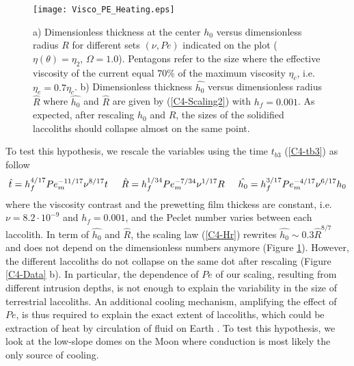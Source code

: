 \begin{figure}[h!]
  \begin{center}
    \graphicspath{ {/Users/thorey/Documents/These/Projet/Refroidissement/Skin_Model/Figure/Figure_Heating/} }
    \texttt{[image: Visco\_PE\_Heating.eps]}
    \caption{a)  Dimensionless thickness  at the  center $h_0$  versus
      dimensionless radius $R$ for different sets $(\nu,Pe)$ indicated
      on  the plot  ($\eta(\theta)=\eta_2$, $\Omega=1.0$).   Pentagons
      refer to the  size where the effective viscosity  of the current
      equal   $70\%$  of   the   maximum   viscosity  $\eta_c$,   i.e.
      $\eta_e=0.7\eta_c$.   b)   Dimensionless  thickness  $\hat{h_0}$
      versus  dimensionless  radius  $\hat{R}$ where  $\hat{h_0}$  and
      $\hat{R}$ are given by (\ref{C4-Scaling2}) with $h_f=0.001$.  As
      expected,  after  rescaling $h_0$  and  $R$,  the sizes  of  the
      solidified  laccoliths  should  collapse   almost  on  the  same
      point. }
    \label{C4-Visco_PE_Heating}
  \end{center}
\end{figure}


To  test this  hypothesis, we  rescale  the variables  using the  time
$t_{b3}$ (\ref{C4-tb3}) as follow
\begin{equation}
  \hat{t}=   h_f^{4/17}  Pe_m^{-11/17}\nu^{8/17}t      \hspace{.5cm}     \hat{R}=
  h_f^{1/34}Pe_m^{-7/34}\nu^{1/17}R\hspace{.5cm}                        \hat{h_0}=
  h_f^{3/17}Pe_m^{-4/17}\nu^{6/17}h_0
  \label{C4-Scaling2}
\end{equation}
where  the viscosity  contrast and  the prewetting  film thickess  are
constant,  i.e. $\nu  =  8.2\cdot 10^{-9}$  and  $h_f=0.001$, and  the
Peclet number varies  between each laccolith.  In  term of $\hat{h_0}$
and    $\hat{R}$,    the    scaling   law    (\ref{C4-Hr})    rewrites
$  \hat{h_0}  \sim  0.3\hat{R}^{8/7}$  and  does  not  depend  on  the
dimensionless            numbers            anymore            (Figure
\ref{C4-Visco_PE_Heating}). However,  the different laccoliths  do not
collapse on the same dot after rescaling (Figure \ref{C4-Data} b).  In
particular,  the dependence  of $Pe$  of our  scaling, resulting  from
different intrusion depths,  is not enough to  explain the variability
in  the  size  of   terrestrial  laccoliths.   An  additional  cooling
mechanism, amplifying the effect of  $Pe$, is thus required to explain
the exact extent  of laccoliths, which could be extraction  of heat by
circulation  of fluid  on Earth  \citep{Senger:2014tt}.  To  test this
hypothesis,  we  look  at  the  low-slope  domes  on  the  Moon  where
conduction is most likely the only source of cooling.

